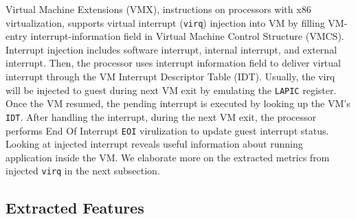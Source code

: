 \documentclass[10pt, conference, compsocconf]{IEEEtran}
\begin{document}
Virtual Machine Extensions (VMX), instructions on processors with x86 virtualization, supports virtual interrupt (\texttt{virq}) injection into VM by filling VM-entry interrupt-information field in Virtual Machine Control Structure (VMCS). Interrupt injection includes software interrupt, internal interrupt, and external interrupt. Then, the processor uses interrupt information field to deliver virtual interrupt through the VM Interrupt Descriptor Table (IDT).  Usually, the virq will be injected to guest during next VM exit by emulating the \texttt{LAPIC} register. Once the VM resumed, the pending interrupt is executed by looking up the VM's \texttt{IDT}. After handling the interrupt, during the next VM exit, the processor performs End Of Interrupt \texttt{EOI} virulization to update guest interrupt status. Looking at injected interrupt reveals useful information about running application inside the VM. We elaborate more on the extracted metrics from injected \texttt{virq} in the next subsection. 


\subsection{Extracted Features}
\end{document}
